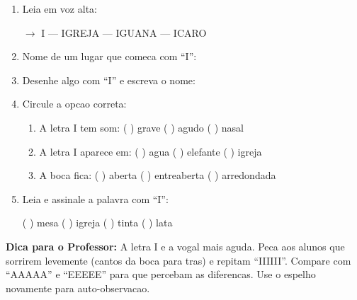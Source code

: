 \begin{exercicio}
\begin{enumerate}[resume]
  \item Leia em voz alta:
  \begin{center}
  $\rightarrow$ I --- IGREJA --- IGUANA --- ICARO
  \end{center}

  \item Nome de um lugar que comeca com ``I'':
  \begin{center}
  \underline{\hspace{6cm}}
  \end{center}

  \item Desenhe algo com ``I'' e escreva o nome:
  \begin{center}
  \end{center}

  \item Circule a opcao correta:
  \begin{enumerate}[label=(\alph*)]
    \item A letra I tem som: ( ) grave ( ) agudo ( ) nasal
    \item A letra I aparece em: ( ) agua ( ) elefante ( ) igreja
    \item A boca fica: ( ) aberta ( ) entreaberta ( ) arredondada
  \end{enumerate}

  \item Leia e assinale a palavra com ``I'':
  \begin{center}
  ( ) mesa \quad ( ) igreja \quad ( ) tinta \quad ( ) lata
  \end{center}
\end{enumerate}
\end{exercicio}

\begin{dica}
\textbf{Dica para o Professor:} A letra I e a vogal mais aguda. Peca aos alunos que sorrirem levemente (cantos da boca para tras) e repitam ``IIIIII''. Compare com ``AAAAA'' e ``EEEEE'' para que percebam as diferencas. Use o espelho novamente para auto-observacao.
\end{dica}




